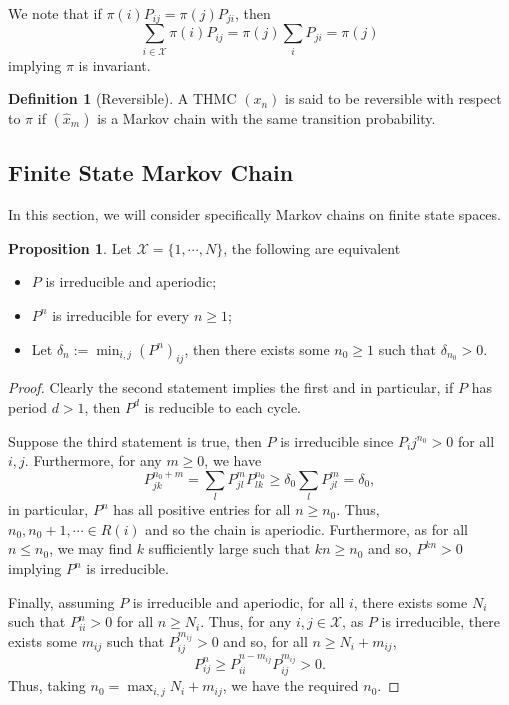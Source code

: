 \documentclass[]{article}
\theoremstyle{definition}
\theoremstyle{definition}
\newtheorem{definition}{Definition}[section]
\newtheorem{proposition}{Proposition}[section]
\begin{document}
We note that if \(\pi(i)P_{ij} = \pi(j)P_{ji}\), then 
\[\sum_{i \in \mathcal{X}} \pi(i) P_{ij} = \pi(j)\sum_{i} P_{ji} = \pi(j)\]
implying \(\pi\) is invariant.

\begin{definition}[Reversible]
  A THMC \((x_n)\) is said to be reversible with respect to \(\pi\) if 
  \((\hat x_m)\) is a Markov chain with the same transition probability.
\end{definition}

\subsection{Finite State Markov Chain}

In this section, we will consider specifically Markov chains on finite 
state spaces. 

\begin{proposition}
  Let \(\mathcal{X} = \{1, \cdots, N\}\), the following are equivalent
  \begin{itemize}
    \item \(P\) is irreducible and aperiodic;
    \item \(P^n\) is irreducible for every \(n \ge 1\);
    \item Let \(\delta_n := \min_{i,j} (P^n)_{ij}\), then there exists some 
      \(n_0 \ge 1\) such that \(\delta_{n_0} > 0\).
  \end{itemize}
\end{proposition}
\begin{proof}
  Clearly the second statement implies the first and in particular, if \(P\) 
  has period \(d > 1\), then \(P^d\) is reducible to each cycle.

  Suppose the third statement is true, then \(P\) is irreducible since 
  \(P_ij^{n_0} > 0\) for all \(i, j\). Furthermore, for any \(m \ge 0\), we have 
  \[P_{jk}^{n_0 + m} = \sum_{l}P^m_{jl}P^{n_0}_{lk} \ge \delta_0 \sum_l P^m_{jl} = 
    \delta_0,\]
  in particular, \(P^n\) has all positive entries for all \(n \ge n_0\). Thus, 
  \(n_0, n_0 + 1, \cdots \in R(i)\) and so the chain is aperiodic. Furthermore, 
  as for all \(n \le n_0\), we may find \(k\) sufficiently large such that 
  \(kn \ge n_0\) and so, \(P^{kn} >0\) implying \(P^n\) is irreducible.

  Finally, assuming \(P\) is irreducible and aperiodic, for all \(i\), 
  there exists some \(N_i\) such that \(P^n_{ii} > 0\) for all \(n \ge N_i\). 
  Thus, for any \(i, j \in \mathcal{X}\), as \(P\) is irreducible, there 
  exists some \(m_{ij}\) such that \(P_{ij}^{m_{ij}} > 0\) and so, for all 
  \(n \ge N_i + m_{ij}\),
  \[P^n_{ij} \ge P^{n - m_{ij}}_{ii} P^{m_{ij}}_{ij} > 0.\]
  Thus, taking \(n_0 = \max_{i, j}N_i + m_{ij}\), we have the required \(n_0\).
\end{proof}
\end{document}
